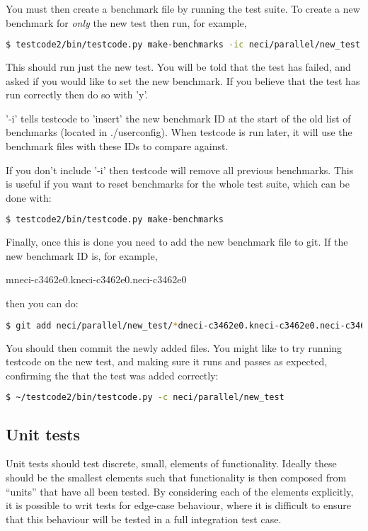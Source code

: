 \documentclass[a4paper,notitlepage]{scrreprt}
\begin{document}
{{{You must then create a benchmark file by running the test suite. To create a
new benchmark for \emph{only} the new test then run, for example,

\begin{lstlisting}[language=bash]
    $ testcode2/bin/testcode.py make-benchmarks -ic neci/parallel/new_test
\end{lstlisting}

This should run just the new test. You will be told that the test has failed,
and asked if you would like to set the new benchmark. If you believe that the
test has run correctly then do so with 'y'.

'-i' tells testcode to 'insert' the new benchmark ID at the start of the old
list of benchmarks (located in ./userconfig). When testcode is run later, it
will use the benchmark files with these IDs to compare against.

If you don't include '-i' then testcode will remove all previous benchmarks.
This is useful if you want to reset benchmarks for the whole test suite, which
can be done with:

\begin{lstlisting}[language=bash]
    $ testcode2/bin/testcode.py make-benchmarks
\end{lstlisting}

Finally, once this is done you need to add the new benchmark file to git.
If the new benchmark ID is, for example,

mneci-c3462e0.kneci-c3462e0.neci-c3462e0

then you can do:

\begin{lstlisting}[language=bash]
    $ git add neci/parallel/new_test/*dneci-c3462e0.kneci-c3462e0.neci-c3462e0*
\end{lstlisting}

You should then commit the newly added files. You might like to try running
testcode on the new test, and making sure it runs and passes as expected,
confirming the that the test was added correctly:

\begin{lstlisting}[language=bash]
    $ ~/testcode2/bin/testcode.py -c neci/parallel/new_test
\end{lstlisting}

\subsection{Unit tests}
    Unit tests should test discrete, small, elements of functionality. Ideally these should be
    the smallest elements such that functionality is then composed from ``units'' that have all
    been tested. By considering each of the elements explicitly, it is possible to writ tests
    for edge-case behaviour, where it is difficult to ensure that this behaviour will be tested
    in a full integration test case.

}}}
\end{document}
